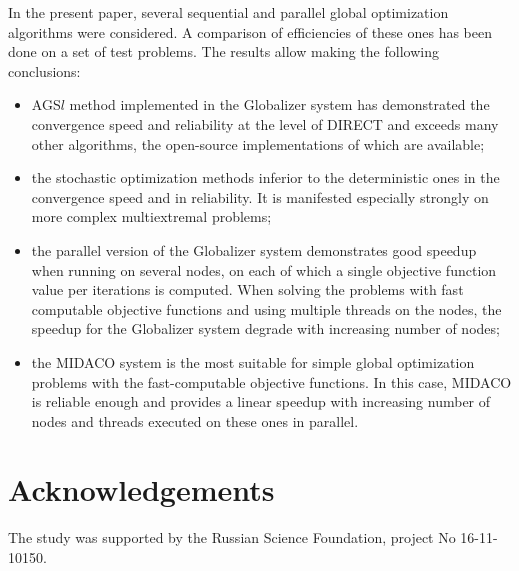 \documentclass{svproc}
\begin{document}
In the present paper, several sequential and parallel global optimization algorithms were considered.
A comparison of efficiencies of these ones has been done on a set of test problems. The results allow
making the following conclusions:
\begin{itemize}
  \item AGS\(l\) method implemented in the Globalizer system has demonstrated the convergence
speed and reliability at the level of DIRECT and exceeds many other algorithms, the open-source
implementations of which are available;
  \item the stochastic optimization methods inferior to the deterministic ones in the convergence
speed and in reliability. It is manifested especially strongly on more complex multiextremal
problems;
  \item the parallel version of the Globalizer system demonstrates good speedup
when running on several nodes, on each of which a single objective function value per iterations is
computed. When solving the problems with fast computable objective functions and using multiple
threads on the nodes, the speedup for the Globalizer system degrade with increasing
number of nodes;
  \item the MIDACO system is the most suitable for simple global optimization problems with the
fast-computable objective functions. In this case, MIDACO is reliable enough and provides a linear
speedup with increasing number of nodes and threads executed on these ones in parallel.
\end{itemize}


\section*{Acknowledgements}
The study was supported by the Russian Science Foundation, project No 16-11-10150.

%
%

{}
\end{document}
